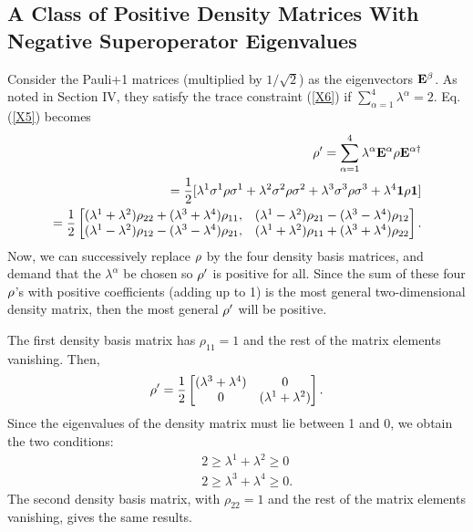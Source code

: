 \documentclass[aps,pra,amssymb, amsfonts,amsmath,showpacs, superscriptaddress,12pt]{revtex4}
\begin{document}
 \begin{appendix}
 \section{A Class of Positive Density Matrices With Negative Superoperator Eigenvalues}\label{A}
 Consider  the Pauli+1 matrices (multiplied by $1/\sqrt{2}$) as the eigenvectors ${\bf E}^{\beta}$. As noted in Section IV, they satisfy the trace constraint (\ref{X6}) if $\sum_{\alpha=1}^{4}\lambda^{\alpha}=2$. 
  Eq.(\ref{X5}) becomes 
\begin{eqnarray}\label{A1}
&&{\bf \rho}'
=\sum_{\alpha=1}^{4}\lambda^{\alpha}{\bf E}^{\alpha}{\bf\rho} {\bf E}^{\alpha\dagger}\nonumber\\
&&=\frac{1}{2}[\lambda^{1}{\bf \sigma}^{1}{\bf\rho} {\bf \sigma}^{1}+\lambda^{2}{\bf \sigma}^{2}{\bf\rho} {\bf \sigma}^{2}+\lambda^{3}{\bf \sigma}^{3}{\bf\rho} {\bf \sigma}^{3}+\lambda^{4}{\bf1}{\bf\rho} {\bf 1}]\nonumber\\
&&\negmedspace\negmedspace\negmedspace\negmedspace=\frac{1}{2}\begin{bmatrix}(\lambda^{1}+\lambda^{2})\rho_{22}+(\lambda^{3}+\lambda^{4})\rho_{11},&(\lambda^{1}-\lambda^{2})\rho_{21}-(\lambda^{3}-\lambda^{4})\rho_{12}
\\(\lambda^{1}-\lambda^{2})\rho_{12}-(\lambda^{3}-\lambda^{4})\rho_{21},&(\lambda^{1}+\lambda^{2})\rho_{11}+(\lambda^{3}+\lambda^{4})\rho_{22}
\end{bmatrix}.\nonumber\\
\end{eqnarray}
\noindent 
 \noindent Now, we can successively replace ${\bf \rho}$  by the four density basis matrices, and demand that the $\lambda^{\alpha}$ be chosen so ${\bf \rho}'$ is positive for all. Since the sum of these four ${\bf \rho}$'s with positive coefficients (adding up to 1) is the  most general two-dimensional density matrix, then the most general ${\bf \rho}'$ will be positive. 
 
 The first density basis matrix has $\rho_{11}=1$ and the rest of the matrix elements vanishing. Then, 
 \begin{equation}\label{A2}
{\bf \rho}'
=\frac{1}{2}\begin{bmatrix}(\lambda^{3}+\lambda^{4})&0
\\0&(\lambda^{1}+\lambda^{2})
\end{bmatrix}.
\end{equation}
Since the eigenvalues of the density matrix must lie between 1 and 0,  we obtain the two conditions:
 \begin{subequations}\label{A3}
 \begin{eqnarray}
&&2\geq\lambda^{1}+\lambda^{2}\geq 0\label{A3a}\\
&&2\geq\lambda^{3}+\lambda^{4}\geq 0.\label{A3b}
\end{eqnarray}
\end{subequations}
\noindent The second density basis matrix,  with $\rho_{22}=1$ and the rest of the matrix elements vanishing, gives the same results.


\end{appendix}
\end{document}
